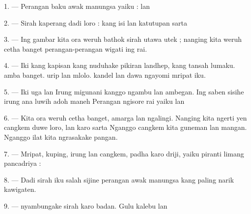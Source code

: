 \VUsaut{4.0mm}
\VUsaut{2.0mm}

\VUsaut{2.4mm}
\VUsaut{3.0mm}

\VUsaut{3.0mm}

1. --- Perangan baku awak manungsa yaiku :  
lan 

2. --- Sirah kaperang dadi loro :  kang isi
 lan katutupan  sarta 

3. --- Ing gambar kita ora weruh bathok sirah utawa utek ; nanging
kita weruh cetha banget perangan-perangan wigati ing rai.

4. --- Iki kang kapisan  kang nuduhake pikiran landhep,
kang tansah lumaku.  amba banget.  urip
lan mlolo.  kandel lan  dawa ngayomi mripat iku.

5. --- Iki uga  lan  Irung migunani
kanggo ngambu lan ambegan. Ing saben sisihe irung ana 
luwih adoh maneh  Perangan ngisore rai yaiku
 lan 

6. --- Kita ora weruh cetha banget, amarga  lan
 ngalingi. Nanging kita ngerti yen cangkem duwe
 loro,  lan 
karo  sarta  Nganggo cangkem kita guneman
lan mangan. Nganggo ilat kita ngrasakake pangan.

7. --- Mripat, kuping, irung lan cangkem, padha karo driji, yaiku
piranti limang pancadriya :  
  

8. --- Dadi sirah iku salah sijine perangan awak manungsa kang paling
narik kawigaten.

\VUsaut{4.4mm}
\VUsaut{3.0mm}

9. ---  nyambungake sirah karo badan. Gulu kalebu
 lan 

